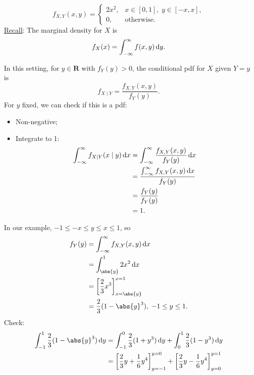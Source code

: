 \begin{Example}{}{}
    \[ f_{X,Y}(x,y)=\begin{cases}
            2x^2, & x\in[0,1],\; y\in[-x,x], \\
            0,    & \text{otherwise}.
        \end{cases} \]
    \underline{Recall}: The marginal density for $ X $ is
    \[ f_X(x)=\int_{-\infty}^{\infty}f(x,y)\odif{y}. \]
    \begin{Definition}{}{}
        In this setting, for $ y\in\mathbf{R} $ with $ f_Y(y)>0 $,
        the conditional pdf for $ X $ given $ Y=y $ is
        \[ f_{X\mid Y}=\frac{f_{X,Y}(x,y)}{f_{Y}(y)}. \]
        For $ y $ fixed, we can check if this is a pdf:
        \begin{itemize}
            \item Non-negative;
            \item Integrate to 1:
                  \begin{align*}
                      \int_{-\infty}^{\infty}f_{X\mid Y}(x\mid y)\odif{x}
                       & =\int_{-\infty}^{\infty}\frac{f_{X,Y}(x,y)}{f_Y(y)}\odif{x} \\
                       & =\frac{\int_{-\infty}^{\infty}f_{X,Y}(x,y)\odif{x}}{f_Y(y)} \\
                       & =\frac{f_Y(y)}{f_Y(y)}                                      \\
                       & =1.
                  \end{align*}
        \end{itemize}
    \end{Definition}
    In our example, $ -1\le -x\le y\le x\le 1 $, so
    \begin{align*}
        f_Y(y)
         & =\int_{-\infty}^{\infty}f_{X,Y}(x,y)\odif{x}    \\
         & =\int_{\abs{y}}^{1}2x^2\odif{x}                 \\
         & =\biggl[\frac{2}{3}x^3\biggr]_{x=\abs{y}}^{x=1} \\
         & =\frac{2}{3}(1-\abs{y}^3),\; -1\le y\le 1.
    \end{align*}
    Check:
    \begin{align*}
        \int_{-1}^{1}\frac{2}{3}(1-\abs{y}^3)\odif{y}
         & =\int_{-1}^{0}\frac{2}{3}(1+y^3)\odif{y}+\int_{0}^{1}\frac{2}{3}(1-y^3)\odif{y}                               \\
         & =\biggl[\frac{2}{3}y+\frac{1}{6}y^4\biggr]_{y=-1}^{y=0}+\biggl[\frac{2}{3}y-\frac{1}{6}y^4\biggr]_{y=0}^{y=1} \\

\end{align*}
\end{Example}
